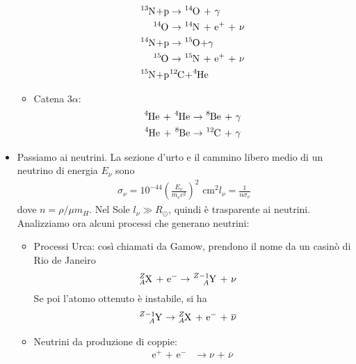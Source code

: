 \documentclass[a4paper,11pt]{article}
\newcommand{\s}{_\odot}
\newcommand{\betapiu}{\textrm{ + e$^+$ + $\nu$}}
\theoremstyle{theorem}
\theoremstyle{definition}
\begin{document}
\begin{itemize}
\begin{itemize}
\begin{align*}
			\tensor[^{13}]{\mathrm{N}}{}\mathrm{ +p}&\rightarrow\tensor[^{14}]{\mathrm{O}}{}\textrm{ + $\gamma$}\\
			\tensor[^{14}]{\mathrm{O}}{}&\rightarrow\tensor[^{14}]{\mathrm{N}}{}\betapiu\\
			\tensor[^{14}]{\mathrm{N}}{}\mathrm{ + p}&\rightarrow\tensor[^{15}]{\mathrm{O}}{}\mathrm{ + }\gamma\\
			\tensor[^{15}]{\mathrm{O}}{}&\rightarrow\tensor[^{15}]{\mathrm{N}}{}\betapiu\\
			\tensor[^{15}]{\mathrm{N}}{}\mathrm{ + p}&\tensor[^{12}]{\mathrm{C}}{}\mathrm{ + }\tensor[^{4}]{\mathrm{He}}{}
			\end{align*}
			\item Catena $3\alpha$:
			\begin{align*}
				\tensor[^{4}]{\mathrm{He}}{}\textrm{ + }\tensor[^{4}]{\mathrm{He}}{}&\rightarrow\tensor[^{8}]{\mathrm{Be}}{}\textrm{ + }\gamma\\
				\tensor[^{4}]{\mathrm{He}}{}\textrm{ + }\tensor[^{8}]{\mathrm{Be}}{}&\rightarrow\tensor[^{12}]{\mathrm{C}}{}\textrm{ + }\gamma
			\end{align*}
		\end{itemize}
		\item Passiamo ai neutrini. La sezione d'urto e il cammino libero medio di un neutrino di energia $E_\nu$ sono
		\begin{align*}
			\sigma_\nu=10^{-44}\left(\frac{E_\nu}{m_ec^2}\right)^2\textrm{ cm}^2
			l_\nu=\frac{1}{n\sigma_\nu}
		\end{align*}
		dove $n=\rho/\mu m_H$. Nel Sole $l_\nu\gg R\s$, quindi è trasparente ai neutrini. Analizziamo ora alcuni processi che generano neutrini:
		\begin{itemize}
			\item Processi Urca: così chiamati da Gamow, prendono il nome da un casinò di Rio de Janeiro
			\begin{align*}
			\tensor*[^{Z}_A]{\mathrm{X}}{}\textrm{ + e}^-&\rightarrow \tensor*[^{Z-1}_{A}]{\mathrm{Y}}{}\textrm{ + }\nu
			\end{align*}
			Se poi l'atomo ottenuto è instabile, si ha
			\begin{align*}
			\tensor*[^{Z-1}_A]{\mathrm{Y}}{}&\rightarrow \tensor*[^{Z}_{A}]{\mathrm{X}}{}\textrm{ + e$^-$ + }\overline\nu
			\end{align*}
			\item Neutrini da produzione di coppie:
			\begin{align*}
				\textrm{e$^+$ + e$^-$}&\rightarrow\nu\textrm{ + }\overline{\nu}

\end{align*}
\end{itemize}
\end{itemize}
\end{document}
